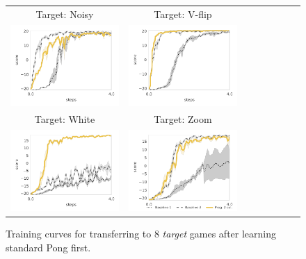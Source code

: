 \begin{figure}
\begin{tabular}{cccccccc}
	Target: Noisy & Target: V-flip \\
	\includegraphics[width=.44\textwidth]{figures/app_plots/pongs/pong/pong_noise} &
        \includegraphics[width=.44\textwidth]{figures/app_plots/pongs/pong/pong_v_flip} \\

	Target: White & Target: Zoom \\
        \includegraphics[width=.44\textwidth]{figures/app_plots/pongs/pong/pong_white} &
        \includegraphics[width=.44\textwidth]{figures/app_plots/pongs_legend/pong/pong_zoom} \\

    \end{tabular}
\caption{Training curves for transferring to 8 \textit{target} games after learning standard Pong first. }
    \label{fig:app_plot_pongs}
\end{figure}

